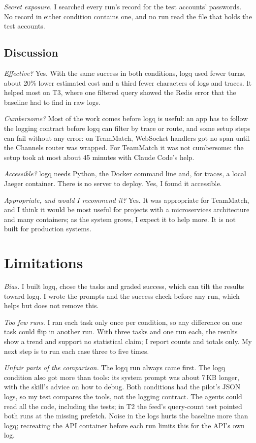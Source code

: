 \documentclass[10pt,conference]{IEEEtran}
\begin{document}
\emph{Secret exposure.} I searched every run's record for the test accounts' passwords. No record in either condition contains one, and no run read the file that holds the test accounts.

\subsection{Discussion}

\emph{Effective?} Yes. With the same success in both conditions, logq used fewer turns, about 20\% lower estimated cost and a third fewer characters of logs and traces. It helped most on T3, where one filtered query showed the Redis error that the baseline had to find in raw logs.

\emph{Cumbersome?} Most of the work comes before logq is useful: an app has to follow the logging contract before logq can filter by trace or route, and some setup steps can fail without any error: on TeamMatch, WebSocket handlers got no span until the Channels router was wrapped. For TeamMatch it was not cumbersome: the setup took at most about 45 minutes with Claude Code's help.

\emph{Accessible?} logq needs Python, the Docker command line and, for traces, a local Jaeger container. There is no server to deploy. Yes, I found it accessible.

\emph{Appropriate, and would I recommend it?} Yes. It was appropriate for TeamMatch, and I think it would be most useful for projects with a microservices architecture and many containers; as the system grows, I expect it to help more. It is not built for production systems.

\section{Limitations}\label{sec:threats}

\emph{Bias.} I built logq, chose the tasks and graded success, which can tilt the results toward logq. I wrote the prompts and the success check before any run, which helps but does not remove this.

\emph{Too few runs.} I ran each task only once per condition, so any difference on one task could flip in another run. With three tasks and one run each, the results show a trend and support no statistical claim; I report counts and totals only. My next step is to run each case three to five times.

\emph{Unfair parts of the comparison.} The logq run always came first. The logq condition also got more than tools: its system prompt was about 7\,KB longer, with the skill's advice on how to debug. Both conditions had the pilot's JSON logs, so my test compares the tools, not the logging contract. The agents could read all the code, including the tests; in T2 the feed's query-count test pointed both runs at the missing prefetch. Noise in the logs hurts the baseline more than logq; recreating the API container before each run limits this for the API's own log.
\end{document}
